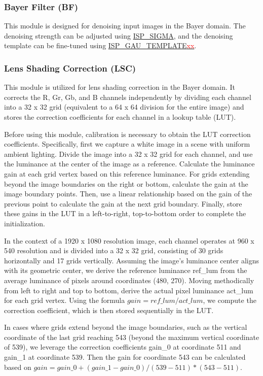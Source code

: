 \documentclass[main\_\_EN.tex]{subfiles}
\begin{document}
\subsubsection{Bayer Filter (BF)}
\label{sec:isp_bf}
This module is designed for denoising input images in the Bayer domain. The denoising strength can be adjusted using \hyperref[fielddesc:ISPSIGMA]{ISP\_SIGMA}, and the denoising template can be fine-tuned using \hyperref[fielddesc:ISPGAUTEMPLATE00]{ISP\_GAU\_TEMPLATE\textcolor{red}{xx}}.


\subsubsection{Lens Shading Correction (LSC)}
\label{sec:isp_lsc}
This module is utilized for lens shading correction in the Bayer domain. It corrects the R, Gr, Gb, and B channels independently by dividing each channel into a 32 x 32 grid (equivalent to a 64 x 64 division for the entire image) and stores the correction coefficients for each channel in a lookup table (LUT).

Before using this module, calibration is necessary to obtain the LUT correction coefficients. Specifically, first we capture a white image in a scene with uniform ambient lighting. Divide the image into a 32 x 32 grid for each channel, and use the luminance at the center of the image as a reference. Calculate the luminance gain at each grid vertex based on this reference luminance. For grids extending beyond the image boundaries on the right or bottom, calculate the gain at the image boundary points. Then, use a linear relationship based on the gain of the previous point to calculate the gain at the next grid boundary. Finally, store these gains in the LUT in a left-to-right, top-to-bottom order to complete the initialization.

In the context of a 1920 x 1080 resolution image, each channel operates at 960 x 540 resolution and is divided into a 32 x 32 grid, consisting of 30 grids horizontally and 17 grids vertically. Assuming the image's luminance center aligns with its geometric center, we derive the reference luminance ref\_lum from the average luminance of pixels around coordinates (480, 270). Moving methodically from left to right and top to bottom, derive the actual pixel luminance act\_lum for each grid vertex. Using the formula $gain = ref\_lum / act\_lum$, we compute the correction coefficient, which is then stored sequentially in the LUT.

In cases where grids extend beyond the image boundaries, such as the vertical coordinate of the last grid reaching 543 (beyond the maximum vertical coordinate of 539), we leverage the correction coefficients gain\_0 at coordinate 511 and gain\_1 at coordinate 539. Then the gain for coordinate 543 can be calculated based on $gain = gain\_0 + (gain\_1 - gain\_0) / (539 - 511) * (543 - 511)$.
\end{document}
